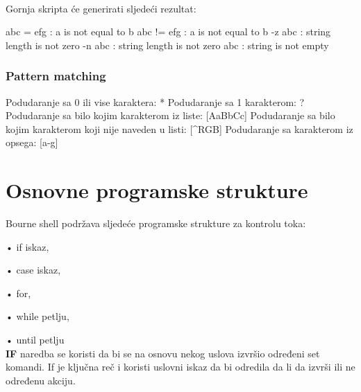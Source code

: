 \documentclass[11pt]{book}
\begin{document}
\\

Gornja skripta će generirati sljedeći rezultat:\\

\begin{shortlisting}
abc = efg : a is not equal to b
abc != efg : a is not equal to b
-z abc : string length is not zero
-n abc : string length is not zero
abc : string is not empty
\end{shortlisting}

\subsubsection{Pattern matching}
\begin{shortlisting}
Podudaranje sa 0 ili vise karaktera: *
Podudaranje sa 1 karakterom: ?
Podudaranje sa bilo kojim karakterom
iz liste: [AaBbCc]
Podudaranje sa bilo kojim karakterom
koji nije naveden u listi: [^RGB]
Podudaranje sa karakterom iz opsega: [a-g]
\end{shortlisting}

\section{Osnovne programske strukture}

Bourne shell podržava sljedeće programske strukture za kontrolu toka: 

•	if iskaz,

•	case iskaz,

•	for,

•	while petlju,

•	until petlju\\


\textbf{IF} naredba se koristi da bi se na osnovu nekog uslova izvršio određeni set komandi. If je ključna reč i koristi uslovni iskaz da bi odredila da li da izvrši ili ne određenu akciju.
\end{document}
